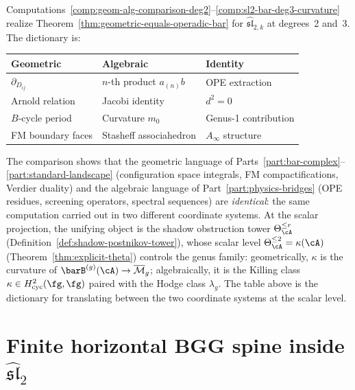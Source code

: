 \begin{remark}
\label{rem:comparison-summary}
Computations~\ref{comp:geom-alg-comparison-deg2}--\ref{comp:sl2-bar-deg3-curvature}
realize Theorem~\ref{thm:geometric-equals-operadic-bar} for
$\widehat{\mathfrak{sl}}_{2,k}$ at degrees~2 and~3. The dictionary is:
\begin{center}
\renewcommand{\arraystretch}{1.3}
\begin{tabular}{lll}
\textbf{Geometric} & \textbf{Algebraic} & \textbf{Identity} \\
\hline
$\partial_{D_{ij}}$ &
 $n$-th product $a_{(n)}b$ & OPE extraction \\
Arnold relation & Jacobi identity & $d^2 = 0$ \\
$B$-cycle period & Curvature $m_0$ & Genus-1 contribution \\
FM boundary faces & Stasheff associahedron & $A_\infty$ structure \\
\end{tabular}
\end{center}
The comparison shows that the geometric language of
Parts~\ref{part:bar-complex}--\ref{part:standard-landscape} (configuration space integrals, FM
compactifications, Verdier duality) and the algebraic language
of Part~\ref{part:physics-bridges} (OPE residues, screening operators,
spectral sequences) are \emph{identical}: the same computation carried out in two
different coordinate systems.
At the scalar projection, the unifying object is the shadow obstruction tower
$\Theta_\cA^{\leq r}$
(Definition~\ref{def:shadow-postnikov-tower}), whose
scalar level $\Theta_\cA^{\leq 2} = \kappa(\cA)$
(Theorem~\ref{thm:explicit-theta})
controls the genus family:
geometrically, $\kappa$ is the curvature of
$\barB^{(g)}(\cA) \to \overline{\mathcal{M}}_g$;
algebraically, it is the Killing class
$\kappa \in H^2_{\mathrm{cyc}}(\fg,\fg)$ paired with
the Hodge class $\lambda_g$. The table above is the
dictionary for translating between the two coordinate
systems at the scalar level.
\end{remark}

\section{\texorpdfstring{Finite horizontal BGG spine inside
$\widehat{\mathfrak{sl}}_2$}{Finite horizontal BGG spine inside sl-2-hat}}
\label{sec:bgg-sl2-bar}

